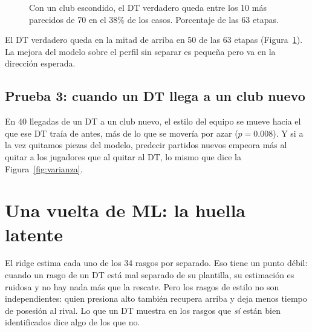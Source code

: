 \documentclass[10pt,a4paper,twocolumn]{article}
\begin{document}
\begin{figure}[H]
\centering
{}
\caption{Con un club escondido, el DT verdadero queda entre los 10 más parecidos de 70 en el 38\% de los casos. Porcentaje de las 63 etapas.}
\label{fig:transfer}
\end{figure}

El DT verdadero queda en la mitad de arriba en 50 de las 63 etapas (Figura~\ref{fig:transfer}). La mejora del modelo sobre el perfil sin separar es pequeña pero va en la dirección esperada.

\subsection{Prueba 3: cuando un DT llega a un club nuevo}
En 40 llegadas de un DT a un club nuevo, el estilo del equipo se mueve hacia el que ese DT traía de antes, más de lo que se movería por azar ($p=0.008$). Y si a la vez quitamos piezas del modelo, predecir partidos nuevos empeora más al quitar a los jugadores que al quitar al DT, lo mismo que dice la Figura~\ref{fig:varianza}.



\section{Una vuelta de ML: la huella latente}\label{sec:latente}
El ridge estima cada uno de los 34 rasgos por separado. Eso tiene un punto débil: cuando un rasgo de un DT está mal separado de su plantilla, su estimación es ruidosa y no hay nada más que la rescate. Pero los rasgos de estilo no son independientes: quien presiona alto también recupera arriba y deja menos tiempo de posesión al rival. Lo que un DT muestra en los rasgos que \emph{sí} están bien identificados dice algo de los que no.
\end{document}
